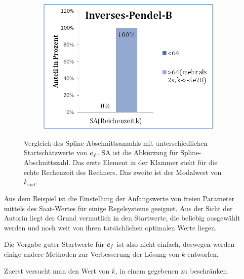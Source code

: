 \begin{figure}[!h]
\begin{subfigure}[t]{0.45\textwidth}
	\end{subfigure}
	\begin{subfigure}[t]{0.45\textwidth}%
		\centering
		\label{fig:SA_for_inversen_Pendel_inverse}
		\includegraphics[width=0.7\linewidth]{bild/30_32/Inverses-Pendel-B.png}
	\end{subfigure}
	\caption[Vergleich des Spline-Abschnittsanzahls mit unterschiedlichen Startschätzwerte von $\vect{c}_{f}$.]{Vergleich des Spline-Abschnittsanzahls mit unterschiedlichen Startschätzwerte von $\vect{c}_{f}$. {SA} ist die Abkürzung für Spline-Abschnittszahl. Das erste Element in der Klammer steht für die echte Rechenzeit des Rechners. Das zweite ist der Modalwert von $k_{end}$.}
	\label{fig:SA}
\end{figure}


Aus dem Beispiel ist die Einstellung der Anfangswerte von freien Parameter mittels des Saat-Wertes für einige Regelsysteme geeignet. Aus der Sicht der Autorin liegt der Grund vermutlich in den Startwerte, die beliebig ausgewählt werden und noch weit von ihren tatsächlichen optimalen Werte liegen.

Die Vorgabe guter Startwerte für $\vect{c}_{f}$ ist also nicht einfach, deswegen werden einige andere Methoden zur Verbesserung der Lösung von $k$ entworfen.
 
Zuerst versucht man den Wert von $k$, in einem gegebenen zu beschränken. %

